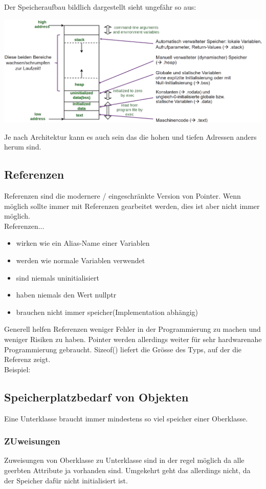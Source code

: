 Der Speicheraufbau bildlich dargestellt sieht ungefähr so aus:

\begin{center}
    \includegraphics[width=\columnwidth]{pictures/memorylayout.png}  
\end{center}

Je nach Architektur kann es auch sein das die hohen und tiefen Adressen anders herum sind.

\subsection{Referenzen}

Referenzen sind die modernere / eingeschränkte Version von Pointer. 
Wenn möglich sollte immer mit Referenzen gearbeitet werden, dies ist aber nicht immer möglich.\\

Referenzen...
\begin{itemize}[itemsep=1pt, parsep=0pt]
    \item wirken wie ein Alias-Name einer Variablen
    \item werden wie normale Variablen verwendet
    \item sind niemals uninitialisiert
    \item haben niemals den Wert nullptr
    \item brauchen nicht immer speicher(Implementation abhängig)
\end{itemize}

Generell helfen Referenzen weniger Fehler in der Programmierung zu machen und weniger Risiken zu haben. 
Pointer werden allerdings weiter für sehr hardwarenahe Programmierung gebraucht. 
Sizeof() liefert die Grösse des Typs, auf der die Referenz zeigt.\\
Beispiel:




\subsection{Speicherplatzbedarf von Objekten}

Eine Unterklasse braucht immer mindestens so viel speicher einer Oberklasse.

\subsubsection{ZUweisungen}

Zuweisungen von Oberklasse zu Unterklasse sind in der regel möglich da alle geerbten Attribute ja vorhanden sind. 
Umgekehrt geht das allerdings nicht, da der Speicher dafür nicht initialisiert ist.